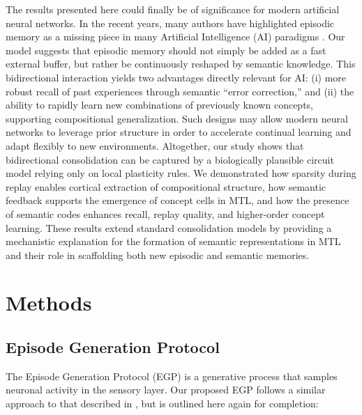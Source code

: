 \documentclass{article}
\begin{document}
\newline\newline
The results presented here could finally be of significance for modern artificial neural networks. In the recent years, many authors have highlighted episodic memory as a missing piece in many Artificial Intelligence (AI) paradigms .  Our model suggests that episodic memory should not simply be added as a fast external buffer, but rather be continuously reshaped by semantic knowledge. This bidirectional interaction yields two advantages directly relevant for AI: (i) more robust recall of past experiences through semantic “error correction,” and (ii) the ability to rapidly learn new combinations of previously known concepts, supporting compositional generalization. Such designs may allow modern neural networks to leverage prior structure in order to accelerate continual learning and adapt flexibly to new environments.
\newline\newline
Altogether, our study shows that bidirectional consolidation can be captured by a biologically plausible circuit model relying only on local plasticity rules. We demonstrated how sparsity during replay enables cortical extraction of compositional structure, how semantic feedback supports the emergence of concept cells in MTL, and how the presence of semantic codes enhances recall, replay quality, and higher-order concept learning. These results extend standard consolidation models by providing a mechanistic explanation for the formation of semantic representations in MTL and their role in scaffolding both new episodic and semantic memories.
\newpage
\section*{Methods}\label{methods}
\subsection*{Episode Generation Protocol}
The Episode Generation Protocol (EGP) is a generative process that samples neuronal activity in the sensory layer. Our proposed EGP follows a similar approach to that described in , but is outlined here again for completion:
\end{document}
